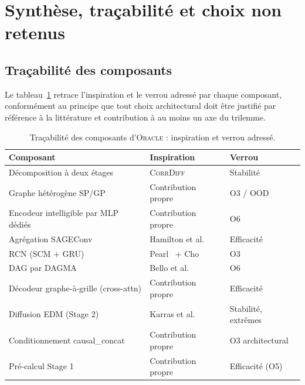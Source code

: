 \documentclass[14pt,a4paper,openany]{extreport}
\theoremstyle{definition}
\newcommand{\Oracle}{\textsc{Oracle}}
\newcommand{\CorrDiff}{\textsc{CorrDiff}}
\begin{document}
\section{Synthèse, traçabilité et choix non retenus}
\label{sec:oracle-synthese}

\subsection{Traçabilité des composants}
\label{ssec:oracle-tab-tracabilite}

Le tableau~\ref{tab:tracabilite} retrace l'inspiration et le verrou adressé par chaque composant, conformément au principe que tout choix architectural doit être justifié par référence à la littérature et contribution à au moins un axe du trilemme.

\begin{table}[ht]
  \centering
  \small
  \caption[Traçabilité des composants]{Traçabilité des composants d'\Oracle{} : inspiration et verrou adressé.}
  \label{tab:tracabilite}
  \begin{tabularx}{\linewidth}{l X l}
    \toprule
    \textbf{Composant} & \textbf{Inspiration} & \textbf{Verrou} \\
    \midrule
    Décomposition à deux étages & \CorrDiff{}~\cite{mardani_corrdiff_2023} & Stabilité\\
    Graphe hétérogène SP/GP & Contribution propre & O3 / OOD\\
    Encodeur intelligible par MLP dédiés & Contribution propre & O6\\
    Agrégation SAGEConv & Hamilton et al.~\cite{hamilton_sage_2017} & Efficacité\\
    RCN (SCM + GRU) & Pearl~\cite{pearl_causality_2009} + Cho~\cite{cho_gru_2014} & O3\\
    DAG par DAGMA & Bello et al.~\cite{bello_dagma_2022} & O6\\
    Décodeur graphe-à-grille (cross-attn) & Contribution propre & Efficacité\\
    Diffusion EDM (Stage 2) & Karras et al.~\cite{karras_edm_2022} & Stabilité, extrêmes\\
    Conditionnement causal\_concat & Contribution propre & O3 architectural\\
    Pré-calcul Stage 1 & Contribution propre & Efficacité (O5)\\
    \bottomrule
  \end{tabularx}
\end{table}
\end{document}
